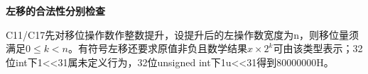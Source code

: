 {\color{ink}\bfseries 左移的合法性分别检查}\par\vspace{1bp}C11/\allowbreak{}C17先对移位操作数作整数提升，设提升后的左操作数宽度为n，则移位量须满足\(0\le k<\allowbreak{}n\)。有符号左移还要求原值非负且数学结果\(x\times 2^{k}\)可由该类型表示；32位int下1<<31属未定义行为，32位unsigned int下1u<<31得到80000000H。
